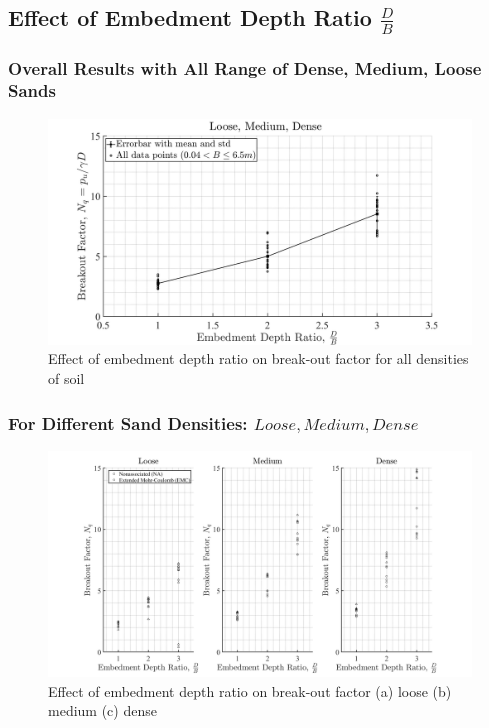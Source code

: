 \documentclass[a4paper, nobind]{templates/ociamthesis}
\begin{document}
\hypertarget{effect-of-embedment-depth-ratio-fracdb}{%
\subsection{\texorpdfstring{Effect of Embedment Depth Ratio \(\frac{D}{B}\)}{Effect of Embedment Depth Ratio \textbackslash frac\{D\}\{B\}}}\label{effect-of-embedment-depth-ratio-fracdb}}

\hypertarget{overall-results-with-all-range-of-dense-medium-loose-sands}{%
\subsubsection{Overall Results with All Range of Dense, Medium, Loose Sands}\label{overall-results-with-all-range-of-dense-medium-loose-sands}}

\begin{figure}[H]
\includegraphics[width=1\linewidth]{myfigureeeeee/errorplot} \caption{Effect of embedment depth ratio on break-out factor for all densities of soil}\label{fig:unnamed-chunk-21}
\end{figure}

\hypertarget{for-different-sand-densities-loose-medium-dense}{%
\subsubsection{\texorpdfstring{For Different Sand Densities: \(Loose, Medium, Dense\)}{For Different Sand Densities: Loose, Medium, Dense}}\label{for-different-sand-densities-loose-medium-dense}}

\begin{figure}[H]
\includegraphics[width=1\linewidth]{myfigureeeeee/loosemediumdense} \caption{Effect of embedment depth ratio on break-out factor (a) loose (b) medium (c) dense}\label{fig:unnamed-chunk-22}
\end{figure}
\end{document}
